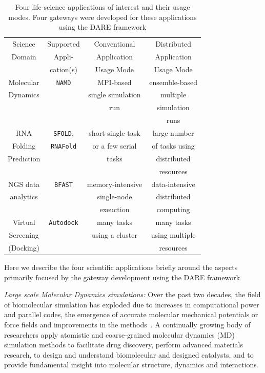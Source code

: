 \documentclass{sig-alternate}
\begin{document}
\begin{table}
 \small
\begin{tabular}{|c|c|c|c|} 
  \hline Science  & Supported  & Conventional   &   Distributed
  \\
  Domain & Appli- & Application & Application \\ 
  &  cation(s) & Usage Mode & Usage Mode \\  \hline \hline 
  
  Molecular   &  \texttt{NAMD} &  MPI-based  & ensemble-based   \\
  Dynamics  &  & single simulation  & multiple  \\ 
  &  & run &  simulation  \\ 
  &  &  &  runs \\ \hline
  RNA   & \texttt{SFOLD}, & short single task    & large number  \\
  Folding   & \texttt{RNAFold} & or a few serial & of tasks using   \\
  Prediction & &  tasks &distributed \\
  &  &  &   resources  \\ \hline
  NGS data     &  \texttt{BFAST} & memory-intensive  & data-intensive\\ 
  analytics  &  &  single-node   &  distributed  \\
  & & exeuction  & computing \\ \hline
  Virtual  & \texttt{Autodock} &  many tasks   & many tasks \\
  Screening  &  & using a cluster  & using multiple  \\
  (Docking) &  &  & resources \\ \hline
  \hline
\end{tabular} \caption{Four life-science applications of interest and their usage modes.  Four gateways were developed for these applications using the DARE framework}
 \label{table:four-applications} 
\end{table}

Here we describe the four scientific applications briefly around the
aspects primarily focused by the gateway development using the DARE
framework

\textit{Large scale Molecular Dynamics simulations:} Over the past two
decades, the field of biomolecular simulation has exploded due to
increases in computational power and parallel codes, the emergence of
accurate molecular mechanical potentials or force fields and
improvements in the methods~\cite{amber,mackerell2008,adcock2006}. A
continually growing body of researchers apply atomistic and
coarse-grained molecular dynamics (MD) simulation methods to
facilitate drug discovery, perform advanced materials research, to
design and understand biomolecular and designed catalysts, and to
provide fundamental insight into molecular structure, dynamics and
interactions\cite{meinke2009,mcdowell2006,beck2007}.
\end{document}
